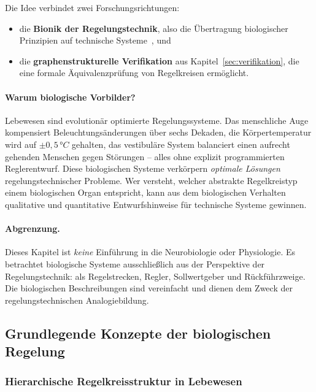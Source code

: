 \documentclass[a4paper,12pt]{article}
\theoremstyle{definition}
\begin{document}
Die Idee verbindet zwei Forschungsrichtungen:
\begin{itemize}
	\item die \textbf{Bionik der Regelungstechnik}, also die Übertragung
	biologischer Prinzipien auf technische Systeme~\cite{ogata,lunze}, und
	\item die \textbf{graphenstrukturelle Verifikation} aus
	Kapitel~\ref{sec:verifikation}, die eine formale Äquivalenz\-prüfung
	von Regelkreisen ermöglicht.
\end{itemize}

\paragraph{Warum biologische Vorbilder?}
Lebewesen sind evolutionär optimierte Regelungssysteme. Das menschliche Auge
kompensiert Beleuchtungsänderungen über sechs Dekaden, die Körpertemperatur
wird auf $\pm 0{,}5\,°C$ gehalten, das vestibuläre System balanciert einen
aufrecht gehenden Menschen gegen Störungen -- alles ohne explizit programmierten
Reglerentwurf. Diese biologischen Systeme verkörpern \emph{optimale Lösungen}
regelungstechnischer Probleme. Wer versteht, welcher abstrakte Regelkreistyp
einem biologischen Organ entspricht, kann aus dem biologischen Verhalten
qualitative und quantitative Entwurfshinweise für technische Systeme gewinnen.

\paragraph{Abgrenzung.}
Dieses Kapitel ist \emph{keine} Einführung in die Neurobiologie oder
Physiologie. Es betrachtet biologische Systeme ausschließlich aus der Perspektive
der Regelungstechnik: als Regelstrecken, Regler, Sollwertgeber und
Rückführzweige. Die biologischen Beschreibungen sind vereinfacht und dienen
dem Zweck der regelungstechnischen Analogiebildung.

\subsection{Grundlegende Konzepte der biologischen Regelung}
\label{subsec:bio_grundlagen}

\subsubsection{Hierarchische Regelkreisstruktur in Lebewesen}
\end{document}
